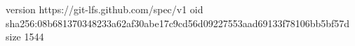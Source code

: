 version https://git-lfs.github.com/spec/v1
oid sha256:08b681370348233a62af30abe17c9cd56d09227553aad69133f78106bb5bf57d
size 1544
